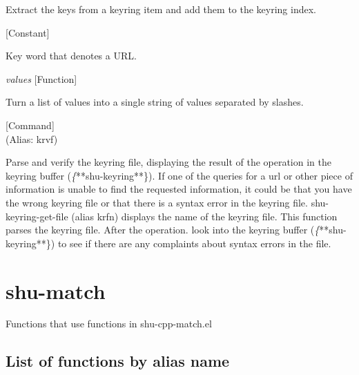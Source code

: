 \begin{doc-string}
Extract the keys from a keyring item and add them to the keyring index.
\end{doc-string}

\vspace{1em}
\noindent
{}
\usebox{\funcname}
 \hfill [Constant]

\begin{doc-string}
Key word that denotes a URL.
\end{doc-string}

\vspace{1em}
\noindent
{}
\usebox{\funcname}\emph{values}
 \hfill [Function]

\begin{doc-string}
Turn a list of values into a single string of values separated by slashes.
\end{doc-string}

\vspace{1em}
\noindent
{}
\usebox{\funcname}
 \hfill [Command]\\%
 (Alias: krvf)

\begin{doc-string}
Parse and verify the keyring file, displaying the result of the operation in the
keyring buffer (\emph\{**shu-keyring**\}).  If one of the queries for a url or other
piece of information is unable to find the requested information, it could be
that you have the wrong keyring file or that there is a syntax error in the
keyring file.  shu-keyring-get-file (alias krfn) displays the name of the
keyring file.  This function parses the keyring file.  After the operation. look
into the keyring buffer (\emph\{**shu-keyring**\}) to see if there are any complaints
about syntax errors in the file.
\end{doc-string}

\eject
\section{shu-match}


Functions that use functions in shu-cpp-match.el


\subsection{List of functions by alias name}

